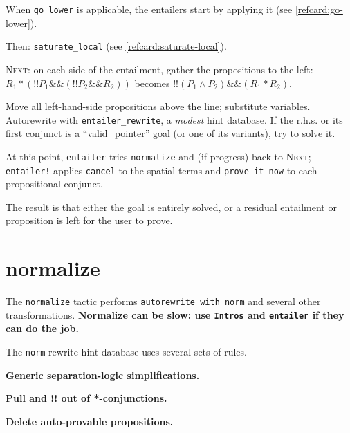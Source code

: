 \documentclass[12pt,fleqn,openany,oneside,showtrims]{memoir}
\begin{document}
When \lstinline{go_lower} is applicable, the entailers start by applying it
(see \autoref{refcard:go-lower}).

Then: \lstinline{saturate_local} (see \autoref{refcard:saturate-local}).

\textsc{Next:} on each side of the entailment, gather the propositions to the left:
\(
R_1 * (!!P_1 \&\& (!!P_2 \&\& R_2))\)
becomes
\(!!(P_1 \wedge P_2) \&\& (R_1 * R_2)\).

Move all left-hand-side propositions above the line; substitute variables.
Autorewrite with \lstinline{entailer_rewrite}, a \emph{modest} hint database.
If the r.h.s. or its first conjunct is a ``valid\_pointer'' goal (or one of its variants), try to solve it.

At this point, \lstinline{entailer} tries \lstinline{normalize} and (if progress) back to \textsc{Next;} \lstinline{entailer!} applies \lstinline{cancel} to the spatial terms and \lstinline{prove_it_now} to each propositional conjunct.

The result is that either the goal is entirely solved, or a residual entailment or proposition is left for the user to prove.

\chapter{normalize}
\label{refcard:normalize}
The \lstinline{normalize} tactic performs
\lstinline{autorewrite with norm} and several other transformations.
\textbf{Normalize can be slow:
  use \lstinline{Intros} and \lstinline{entailer}
  if they can do the job.}

The \lstinline{norm} rewrite-hint database uses several sets of rules.

\textbf{Generic separation-logic simplifications.}
\textbf{Pull \EX and !! out of *-conjunctions.}
\textbf{Delete auto-provable propositions.}
\end{document}
